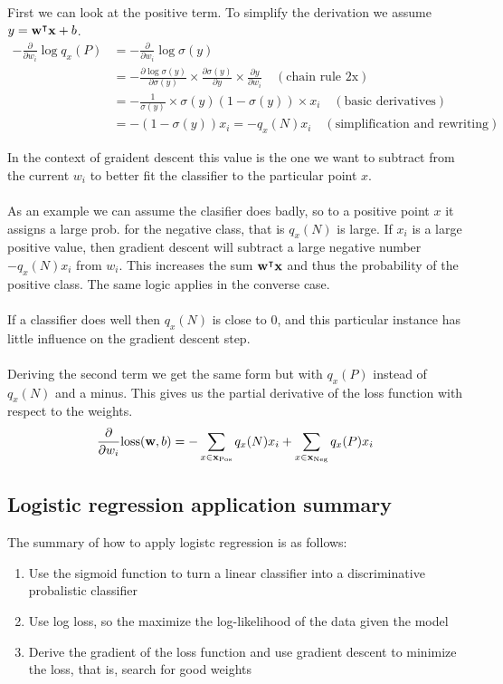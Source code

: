 \documentclass[12pt]{article}
\begin{document}
First we can look at the positive term. To simplify the derivation we assume $y = \mathbf{w} ^\intercal \mathbf{x} + b$. 
\begin{align*}
    -\frac{\partial}{\partial w_i}\log q_x(P) & = -\frac{\partial}{\partial w_i}\log \sigma(y) \\
    & = -\frac{\partial \log \sigma(y)}{\partial \sigma(y)} \times \frac{\partial \sigma(y)}{\partial y} \times \frac{\partial y}{\partial w_i} \quad (\text{chain rule 2x}) \\
    & = -\frac{1}{\sigma(y)} \times \sigma(y)(1-\sigma(y)) \times x_i \quad (\text{basic derivatives}) \\
    & = -(1-\sigma(y))x_i = -q_x(N)x_i \quad (\text{simplification and rewriting})
\end{align*}

In the context of graident descent this value is the one we want to subtract from the current $w_i$ to better fit the classifier to the particular point $x$. \\ \\ 
As an example we can assume the clasifier does badly, so to a positive point $x$ it assigns a large prob. for the negative class, that is $q_x(N)$ is large. If $x_i$ is a large positive value, then gradient descent will subtract a large negative number $-q_x(N)x_i$ from $w_i$. This increases the sum $\mathbf{w} ^\intercal \mathbf{x}$ and thus the probability of the positive class. The same logic applies in the converse case.\\ \\ 
If a classifier does well then $q_x(N)$ is close to 0, and this particular instance has little influence on the gradient descent step. \\ \\
Deriving the second term we get the same form but with $q_x(P)$ instead of $q_x(N)$ and a minus. This gives us the partial derivative of the loss function with respect to the weights.
\[
    \frac{\partial}{\partial w_i} \text{loss}(\mathbf{w}, b) = -\sum_{x\in \mathbf{x} _\text{Pos}} q_x(N)x_i + \sum_{x\in\mathbf{x}_\text{Neg}} q_x(P)x_i
\]

\subsection{Logistic regression application summary}

The summary of how to apply logistc regression is as follows: 
\begin{enumerate}[leftmargin=*, noitemsep]
    \item Use the sigmoid function to turn a linear classifier into a discriminative probalistic classifier
    \item Use log loss, so the maximize the log-likelihood of the data given the model
    \item Derive the gradient of the loss function and use gradient descent to minimize the loss, that is, search for good weights 
\end{enumerate}
\end{document}
